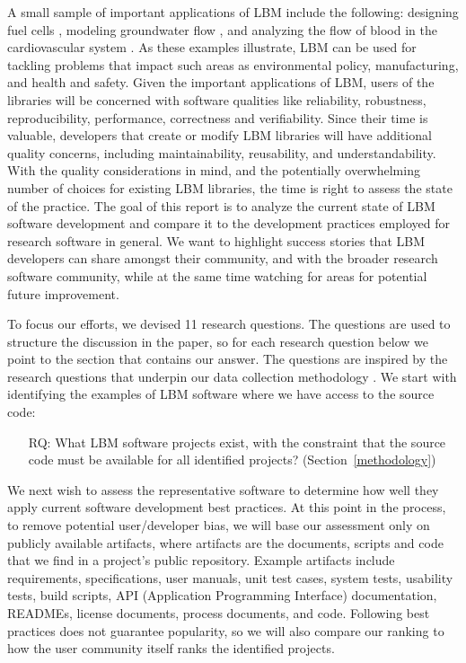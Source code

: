 \documentclass[final, 3p, times, authoryear]{elsarticle}
\newcounter{rqnum} %
\begin{document}
A small sample of important applications of LBM include the following: designing
fuel cells \citep{ZhangEtAl2018}, modeling groundwater flow
\citep{AnwarAndSukop2009}, and analyzing the flow of blood in the cardiovascular
system \citep{SadeghiEtAl2020}.  As these examples illustrate, LBM can be used
for tackling problems that impact such areas as environmental policy,
manufacturing, and health and safety.  Given the important applications of LBM,
users of the libraries will be concerned with software qualities like
reliability, robustness, reproducibility, performance, correctness and
verifiability.  Since their time is valuable, developers that create or modify
LBM libraries will have additional quality concerns, including maintainability,
reusability, and understandability.  With the quality considerations in mind,
and the potentially overwhelming number of choices for existing LBM libraries,
the time is right to assess the state of the practice.  The goal of this report
is to analyze the current state of LBM software development and compare it to
the development practices employed for research software in general.  We want to
highlight success stories that LBM developers can share amongst their
community, and with the broader research software community, while at the same time watching for areas for potential future improvement.

To focus our efforts, we devised 11 research questions.  The questions are used
to structure the discussion in the paper, so for each research question below we
point to the section that contains our answer.  The questions are inspired by
the research questions that underpin our data collection methodology
\citep{SmithEtAl2021}. We start with identifying the examples of LBM software
where we have access to the source code:

\begin{enumerate}
	\item[RQ\refstepcounter{rqnum}\therqnum \label{RQ_WhatProjects}:] What LBM
	software projects exist, with the constraint that the source code must be
	available for all identified projects? (Section~\ref{methodology})
\end{enumerate}

We next wish to assess the representative software to determine how well they
apply current software development best practices.  At this point in the
process, to remove potential user/developer bias, we will base our assessment
only on publicly available artifacts, where artifacts are the documents, scripts
and code that we find in a project's public repository. Example artifacts
include requirements, specifications, user manuals, unit test cases, system
tests, usability tests, build scripts, API (Application Programming Interface)
documentation, READMEs, license documents, process documents, and code.
Following best practices does not guarantee popularity, so we will also compare
our ranking to how the user community itself ranks the identified projects.
\end{document}
